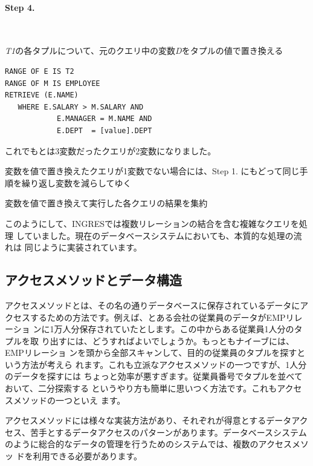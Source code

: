 \paragraph{Step 4.} \ 


{\it T1}の各タプルについて、元のクエリ中の変数{\it D}をタプルの値で置き換える

\begin{center}
 \begin{minipage}{0.8\textwidth}
  \begin{lstlisting}
RANGE OF E IS T2
RANGE OF M IS EMPLOYEE
RETRIEVE (E.NAME)
   WHERE E.SALARY > M.SALARY AND
            E.MANAGER = M.NAME AND
            E.DEPT  = [value].DEPT
  \end{lstlisting}
 \end{minipage}
\end{center}

これでもとは3変数だったクエリが2変数になりました。


変数を値で置き換えたクエリが1変数でない場合には、Step 1. にもどって同じ手順を繰り返し変数を減らしてゆく


変数を値で置き換えて実行した各クエリの結果を集約

このようにして、INGRESでは複数リレーションの結合を含む複雑なクエリを処理
していました。現在のデータベースシステムにおいても、本質的な処理の流れは
同じように実装されています。

\subsection{アクセスメソッドとデータ構造}


アクセスメソッドとは、その名の通りデータベースに保存されているデータにア
クセスするための方法です。例えば、とある会社の従業員のデータがEMPリレーショ
ンに1万人分保存されていたとします。この中からある従業員1人分のタプルを取
り出すには、どうすればよいでしょうか。もっともナイーブには、EMPリレーショ
ンを頭から全部スキャンして、目的の従業員のタプルを探すという方法が考えら
れます。これも立派なアクセスメソッドの一つですが、1人分のデータを探すには
ちょっと効率が悪すぎます。従業員番号でタプルを並べておいて、二分探索する
というやり方も簡単に思いつく方法です。これもアクセスメソッドの一つといえ
ます。


アクセスメソッドには様々な実装方法があり、それぞれが得意とするデータアク
セス、苦手とするデータアクセスのパターンがあります。データベースシステム
のように総合的なデータの管理を行うためのシステムでは、複数のアクセスメソッ
ドを利用できる必要があります。


